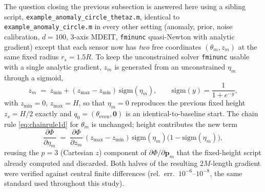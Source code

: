 \documentclass[11pt,a4paper]{article}
\newcommand{\code}[1]{\texttt{#1}}
\begin{document}
The question closing the previous subsection is answered here using a sibling script,
\code{example\_anomaly\_circle\_thetaz.m}, identical to \code{example\_anomaly\_circle.m} in every
other setting (anomaly, prior, noise calibration, $d=100$, 3-axis MDEIT, \code{fminunc}
quasi-Newton with analytic gradient) except that each sensor now has \emph{two} free coordinates
$(\theta_m, z_m)$ at the same fixed radius $r_s = 1.5R$. To keep the unconstrained solver
\code{fminunc} usable with a single analytic gradient, $z_m$ is generated from an unconstrained
$\eta_m$ through a sigmoid,
\begin{equation}
\label{eq:sigmoidmap}
  z_m \;=\; z_{\min} + (z_{\max}-z_{\min})\,\mathrm{sigm}(\eta_m), \qquad
  \mathrm{sigm}(y) = \frac{1}{1+e^{-y}},
\end{equation}
with $z_{\min}=0$, $z_{\max}=H$, so that $\eta_m = 0$ reproduces the previous fixed height
$z_s = H/2$ exactly and $q_0 = (\theta_{\mathrm{even}}, \bm 0)$ is an identical-to-baseline start.
The chain rule \eqref{eq:chainrule1d} for $\theta_m$ is unchanged; height contributes the new term
\begin{equation}
\label{eq:etachainrule}
  \frac{\partial \Phi}{\partial \eta_m}
  \;=\;
  \frac{\partial \Phi}{\partial z_m}\,(z_{\max}-z_{\min})\,
  \mathrm{sigm}(\eta_m)\bigl(1-\mathrm{sigm}(\eta_m)\bigr),
\end{equation}
reusing the $p=3$ (Cartesian $z$) component of $\partial\Phi/\partial \bm p_m$ that the fixed-height
script already computed and discarded. Both halves of the resulting $2M$-length gradient were
verified against central finite differences (rel.\ err.\ $10^{-6}$--$10^{-8}$, the same standard
used throughout this study).
\end{document}
